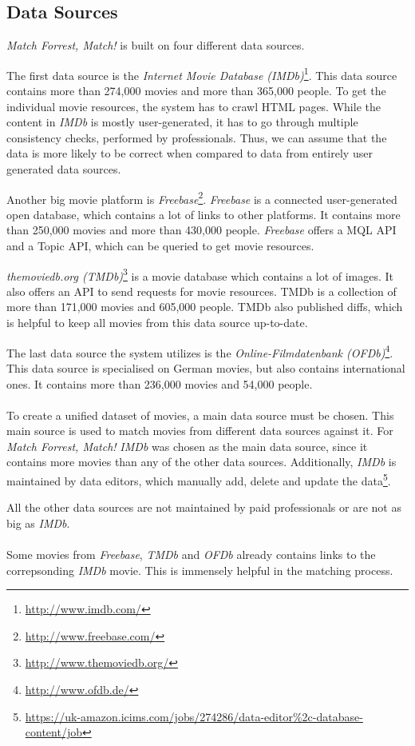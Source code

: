 \subsection{Data Sources}
\label{subsec_method_datasources}

\emph{Match Forrest, Match!} is built on four different data sources.

The first data source is the \textit{Internet Movie Database (IMDb)}\footnote{\url{http://www.imdb.com/}}.
This data source contains more than 274,000 movies and more than 365,000 people.
To get the individual movie resources, the system has to crawl HTML pages.
While the content in \textit{IMDb} is mostly user-generated, it has to go through multiple consistency checks, performed by professionals. \cite{IMDb_DataCreation}
Thus, we can assume that the data is more likely to be correct when compared to data from entirely user generated data sources.

Another big movie platform is \textit{Freebase}\footnote{\url{http://www.freebase.com/}}.
\textit{Freebase} is a connected user-generated open database, which contains a lot of links to other platforms.
It contains more than 250,000 movies and more than 430,000 people.
\textit{Freebase} offers a MQL API and a Topic API, which can be queried to get movie resources.

\textit{themoviedb.org (TMDb)}\footnote{\url{http://www.themoviedb.org/}} is a movie database which contains a lot of images.
It also offers an API to send requests for movie resources.
TMDb is a collection of more than 171,000 movies and 605,000 people.
TMDb also published diffs, which is helpful to keep all movies from this data source up-to-date.

The last data source the system utilizes is the \textit{Online-Filmdatenbank (OFDb)}\footnote{\url{http://www.ofdb.de/}}.
This data source is specialised on German movies, but also contains international ones.
It contains more than 236,000 movies and 54,000 people.
\\ \\
To create a unified dataset of movies, a main data source must be chosen.
This main source is used to match movies from different data sources against it.
For \emph{Match Forrest, Match!} \textit{IMDb} was chosen as the main data source, since it contains more movies than any of the other data sources.
Additionally, \textit{IMDb} is maintained by data editors, which manually add, delete and update the data\footnote{\url{https://uk-amazon.icims.com/jobs/274286/data-editor\%2c-database-content/job}}.

All the other data sources are not maintained by paid professionals or are not as big as \textit{IMDb}.
\\ \\
Some movies from \textit{Freebase}, \textit{TMDb} and \textit{OFDb} already contains links to the correpsonding \textit{IMDb} movie.
This is immensely helpful in the matching process.